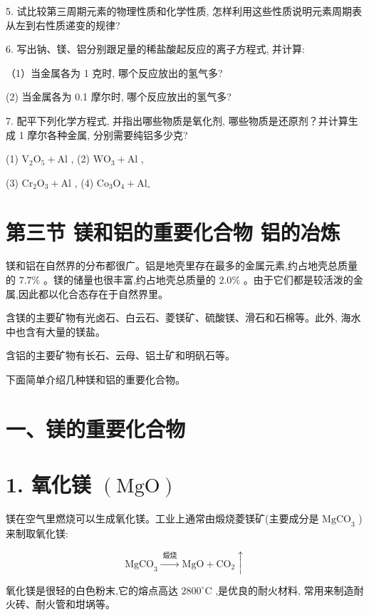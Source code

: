 \documentclass[10pt]{article}
\begin{document}
5. 试比较第三周期元素的物理性质和化学性质, 怎样利用这些性质说明元素周期表从左到右性质递变的规律?

6. 写出钠、镁、铝分别跟足量的稀盐酸起反应的离子方程式, 并计算:

（1）当金属各为 1 克时, 哪个反应放出的氢气多?

(2) 当金属各为 0.1 摩尔时, 哪个反应放出的氢气多?

7. 配平下列化学方程式, 并指出哪些物质是氧化剂, 哪些物质是还原剂？并计算生成 1 摩尔各种金属, 分别需要纯铝多少克?

(1) \({\mathrm{V}}_{2}{\mathrm{O}}_{5} + \mathrm{{Al}}\) , (2) \({\mathrm{{WO}}}_{3} + \mathrm{{Al}}\) ,

(3) \({\mathrm{{Cr}}}_{2}{\mathrm{O}}_{3} + \mathrm{{Al}}\) , (4) \({\mathrm{{Co}}}_{3}{\mathrm{O}}_{4} + {\mathrm{{Al}}}_{ \circ }\)

\section*{第三节 镁和铝的重要化合物 铝的冶炼}

镁和铝在自然界的分布都很广。铝是地壳里存在最多的金属元素,约占地壳总质量的 \({7.7}\%\) 。镁的储量也很丰富,约占地壳总质量的 \({2.0}\%\) 。由于它们都是较活泼的金属,因此都以化合态存在于自然界里。

含镁的主要矿物有光卤石、白云石、菱镁矿、硫酸镁、滑石和石棉等。此外, 海水中也含有大量的镁盐。

含铝的主要矿物有长石、云母、铝土矿和明矾石等。

下面简单介绍几种镁和铝的重要化合物。

\section*{一、镁的重要化合物}

\section*{1. 氧化镁 \(\left( \mathrm{{MgO}}\right)\)}

镁在空气里燃烧可以生成氧化镁。工业上通常由煅烧菱镁矿(主要成分是 \({\mathrm{{MgCO}}}_{3}\) ) 来制取氧化镁:

\[
{\mathrm{{MgCO}}}_{3}\xrightarrow[]{\text{ 煅烧 }}\mathrm{{MgO}} + {\mathrm{{CO}}}_{2} \uparrow
\]

氧化镁是很轻的白色粉末,它的熔点高达 \({2800}^{ \circ }\mathrm{C}\) ,是优良的耐火材料, 常用来制造耐火砖、耐火管和坩埚等。
\end{document}
